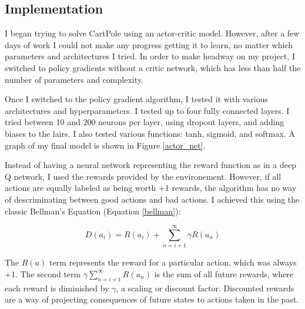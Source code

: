 \documentclass[12pt,a4paper]{article}
\begin{document}
\subsection*{Implementation}

I began trying to solve CartPole using an actor-critic model. However, after a few days of work I could not make any progress getting it to learn, no matter which parameters and architectures I tried. In order to make headway on my project, I switched to policy gradients without a critic network, which has less than half the number of parameters and complexity.

Once I switched to the policy gradient algorithm, I tested it with various architectures and hyperparameters. I tested up to four fully connected layers. I tried between 10 and 200 neurons per layer, using dropout layers, and adding biases to the lairs. I also tested various functions: tanh, sigmoid, and softmax. A graph of my final model is shown in Figure \ref{actor_net}.


Instead of having a neural network representing the reward function as in a deep Q network, I used the rewards provided by the environement. However, if all actions are equally labeled as being worth +1 rewards, the algorithm has no way of descriminating between good actions and bad actions. I achieved this using the classic Bellman's Equation (Equation \ref{bellman}):

\begin{equation}\label{bellman}
D(a_i) = R(a_i) + \sum_{n=i+1}^{\infty}{ \gamma R(a_n)} 
\end{equation}

The $R(a)$ term represents the reward for a particular action, which was always +1. The second term $\gamma \sum_{n=i+1}^{\infty}{R(a_n)}$ is the sum of all future rewards, where each reward is diminished by $\gamma$, a scaling or discount factor. Discounted rewards are a way of projecting consequences of future states to actions taken in the past.
\end{document}
